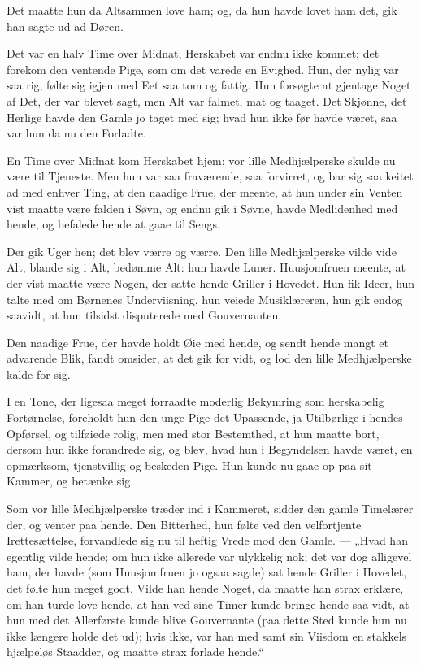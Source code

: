 \documentclass[12pt,a4paper]{book}
\newcommand{\apage}[1]{\marginnote{\footnotesize\textit{[#1]}}}
\begin{document}
Det maatte hun da Altsammen love ham; og, da hun havde lovet ham
det, gik han sagte ud ad Døren.

Det var en halv Time over Midnat, Herskabet var endnu ikke kommet;
det forekom den ventende Pige, som om det varede en Evighed. Hun,
der nylig var saa rig, følte sig igjen med Eet saa tom og fattig.
Hun forsøgte at gjentage Noget af Det, der var blevet sagt, men Alt
var falmet, mat og taaget. Det Skjønne, det Herlige havde den
Gamle jo taget med sig; hvad hun ikke før havde været, saa var hun
da nu den Forladte.

En Time over Midnat kom Herskabet hjem; vor lille Medhjælperske
skulde nu være til Tjeneste. Men hun var saa \apage{89} fraværende, saa
forvirret, og bar sig saa keitet ad med enhver Ting, at den naadige
Frue, der meente, at hun under sin Venten vist maatte være falden
i Søvn, og endnu gik i Søvne, havde Medlidenhed med hende, og
befalede hende at gaae til Sengs.

Der gik Uger hen; det blev værre og værre. Den lille Medhjælperske
vilde vide Alt, blande sig i Alt, bedømme Alt: hun havde Luner.
Huusjomfruen meente, at der vist maatte være Nogen, der satte
hende Griller i Hovedet. Hun fik Ideer, hun talte med om Børnenes
Underviisning, hun veiede Musiklæreren, hun gik endog saavidt, at
hun tilsidst disputerede med Gouvernanten.

Den naadige Frue, der havde holdt Øie med hende, og sendt hende
mangt et advarende Blik, fandt omsider, at det gik for vidt, og lod
den lille Medhjælperske kalde for sig.

I en Tone, der ligesaa meget forraadte moderlig Bekymring som
herskabelig Fortørnelse, foreholdt hun den unge Pige det
Upassende, ja Utilbørlige i hendes Opførsel, og tilføiede rolig,
men med stor Bestemthed, at hun maatte bort, dersom hun ikke
forandrede sig, og blev, hvad hun i Begyndelsen havde været, en
opmærksom, tjenstvillig og beskeden Pige. Hun kunde nu gaae op paa
sit Kammer, og betænke sig.

Som vor lille Medhjælperske træder ind i Kammeret, sidder den
gamle Timelærer der, og venter paa hende. Den Bitterhed, hun
følte ved den velfortjente Irettesættelse, forvandlede sig nu til
heftig Vrede mod den Gamle. --- „Hvad han egentlig vilde hende; om
hun ikke allerede var ulykkelig nok; det var dog alligevel ham,
der havde (som Huusjomfruen jo ogsaa sagde) sat hende Griller i
Hovedet, det følte hun meget godt. Vilde han hende Noget, da maatte
han strax erklære, om han turde love hende, at han ved sine Timer
kunde bringe hende saa vidt, at hun med det Allerførste kunde blive
Gouvernante (paa dette Sted kunde hun nu ikke \apage{90}
længere holde det ud); hvis ikke, var han med samt sin Viisdom en
stakkels hjælpeløs Staadder, og maatte strax forlade hende.“
\end{document}
